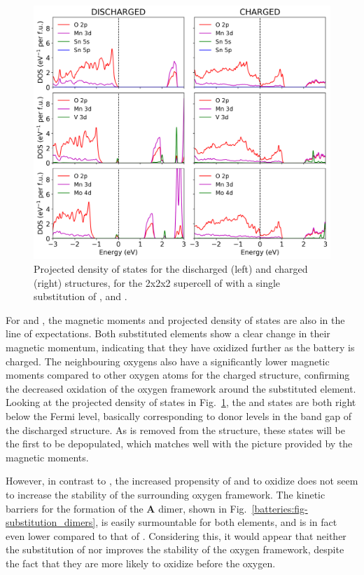 \begin{refsection}
\begin{figure}[h] 
\centering 

\includegraphics[width=\textwidth]{figures/batteries/substitution_pdos_pbeu.png} 
\caption{Projected density of states for the discharged (left) and charged 
(right) structures, for the 2x2x2 supercell of  with a single 
substitution of ,  and .} 
\label{batteries:fig-substitution_pdos_pbeu} 
\end{figure} 
 
For  and , the magnetic moments and projected density of states 
are also in the line of expectations. Both substituted elements show a clear 
change in their magnetic momentum, indicating that they have oxidized further 
as the battery is charged. The neighbouring oxygens  also have a 
significantly lower magnetic moments compared to other oxygen atoms  
for the charged structure, confirming the decreased oxidation of the oxygen 
framework around the substituted element. Looking at the projected density of 
states in Fig.~\ref{batteries:fig-substitution_pdos_pbeu}, the  and 
 states are both right below the Fermi level, basically corresponding 
to donor levels in the band gap of the discharged  structure. As 
 is removed from the structure, these states will be the first to be 
depopulated, which matches well with the picture provided by the magnetic 
moments. 
 
However, in contrast to , the increased propensity of  and 
 to oxidize does not seem to increase the stability of the surrounding 
oxygen framework. The kinetic barriers for the formation of the \textbf{A} 
dimer, shown in Fig.~\ref{batteries:fig-substitution_dimers}, is easily 
surmountable for both elements, and is in fact even lower compared to that of 
. Considering this, it would appear that neither the substitution 
of  nor  improves the stability of the oxygen framework, despite 
the fact that they are more likely to oxidize before the oxygen.  
 

\end{refsection}
